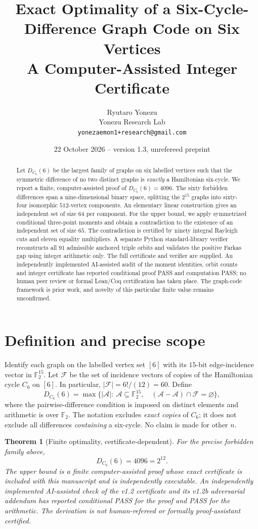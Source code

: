 \documentclass[11pt,a4paper]{article}
\title{Exact Optimality of a Six-Cycle-Difference Graph Code on Six Vertices\\[4pt]\large A Computer-Assisted Integer Certificate}
\author{Ryutaro Yonezu\\Yonezu Research Lab\\\texttt{yonezaemon1+research@gmail.com}}
\date{22 October 2026 \quad -- \quad version 1.3, unrefereed preprint}
\newtheorem{theorem}{Theorem}
\newcommand{\F}{\mathbb F}
\newcommand{\calF}{\mathcal F}
\begin{document}
\maketitle
\begin{abstract}
Let $D_{C_6}(6)$ be the largest family of graphs on six labelled vertices such that the symmetric difference of no two distinct graphs is \emph{exactly} a Hamiltonian six-cycle. We report a finite, computer-assisted proof of
\(D_{C_6}(6)=4096.\)
The sixty forbidden differences span a nine-dimensional binary space, splitting the $2^{15}$ graphs into sixty-four isomorphic $512$-vertex components. An elementary linear construction gives an independent set of size $64$ per component. For the upper bound, we apply symmetrized conditional three-point moments and obtain a contradiction to the existence of an independent set of size $65$. The contradiction is certified by ninety integral Rayleigh cuts and eleven equality multipliers. A separate Python standard-library verifier reconstructs all $91$ admissible anchored triple orbits and validates the positive Farkas gap using integer arithmetic only. The full certificate and verifier are supplied. An independently implemented AI-assisted audit of the moment identities, orbit counts and integer certificate has reported conditional proof PASS and computation PASS; no human peer review or formal Lean/Coq certification has taken place. The graph-code framework is prior work, and novelty of this particular finite value remains unconfirmed.
\end{abstract}

\section{Definition and precise scope}
Identify each graph on the labelled vertex set $[6]$ with its $15$-bit edge-incidence vector in $\F_2^{15}$. Let $\calF$ be the set of incidence vectors of copies of the Hamiltonian cycle $C_6$ on $[6]$. In particular, $|\calF|=6!/(12)=60$. Define
\[
D_{C_6}(6)=\max\bigl\{|\mathcal A|:\ \mathcal A\subseteq\F_2^{15},\quad
 (\mathcal A-\mathcal A)\cap\calF=\varnothing\bigr\},
\]
where the pairwise-difference condition is imposed on distinct elements and arithmetic is over $\F_2$. The notation excludes \emph{exact copies} of $C_6$; it does not exclude all differences \emph{containing} a six-cycle. No claim is made for other $n$.

\begin{theorem}[Finite optimality, certificate-dependent]\label{thm:main}
For the precise forbidden family above,
\[
\boxed{D_{C_6}(6)=4096=2^{12}.}
\]
The upper bound is a finite computer-assisted proof whose exact certificate is included with this manuscript and is independently executable. An independently implemented AI-assisted check of the v1.2 certificate and its v1.2b adversarial addendum has reported conditional PASS for the proof and PASS for the arithmetic. The derivation is not human-refereed or formally proof-assistant certified.
\end{theorem}
\end{document}
